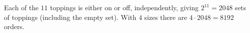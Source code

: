 Each of the $11$ toppings is either on or off, independently, giving $2^{11}=2048$ sets of toppings (including the empty set). With $4$ sizes there are $4\cdot2048=\boxed{8192}$ orders.
